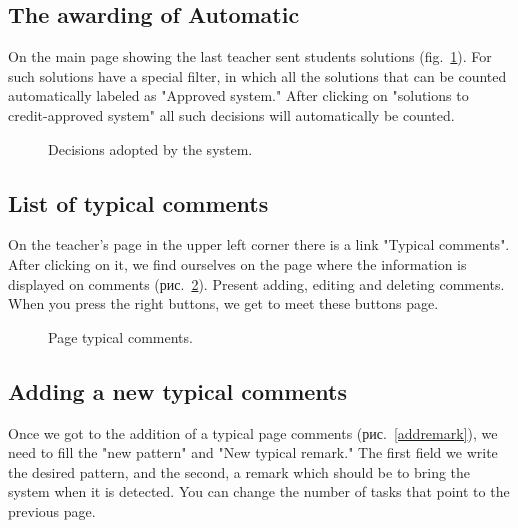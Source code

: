 \documentclass{acmtog} %
\begin{document}
\subsection{The awarding of Automatic}
On the main page showing the last teacher sent students solutions (fig.~\ref{systemok}). For such solutions have a special filter, in which all the solutions that can be counted automatically labeled as "Approved system." After clicking on "solutions to credit-approved system" all such decisions will automatically be counted.
\begin{figure}[h]
\caption{Decisions adopted by the system.}
\label{systemok}
\end{figure}

\subsection{List of typical comments}
On the teacher's page in the upper left corner there is a link "Typical comments". After clicking on it, we find ourselves on the page where the information is displayed on comments (рис.~\ref{remark}). Present adding, editing and deleting comments. When you press the right buttons, we get to meet these buttons page.

\begin{figure}[h]
\caption{Page typical comments.}
\label{remark}
\end{figure}

\subsection{Adding a new typical comments}
Once we got to the addition of a typical page comments (рис.~\ref{addremark}), we need to fill the "new pattern" and "New typical remark." The first field we write the desired pattern, and the second, a remark which should be to bring the system when it is detected. You can change the number of tasks that point to the previous page.
\end{document}
